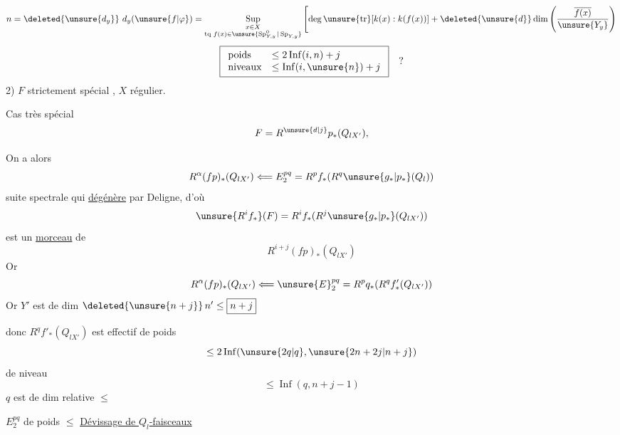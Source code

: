 \diagram{\[
\begin{tikzcd}
X\arrow[d,"f"]\\
Y\ni y
\end{tikzcd}
\]}
\[
n=\deleted{\unsure{d_y}}\ d_y(\unsure{f|\varphi})
=\underset{\substack{x\in X\\ \text{tq }f(x)\in\unsure{\operatorname{Sp}^{0}_{Y,y}|\operatorname{Sp}_{Y,y}}}}{\operatorname{Sup}}
\left[\deg\unsure{\operatorname{tr}}[k(x):k(f(x))]
+\deleted{\unsure{d}}\dim\left(\frac{\overline{f(x)}}{\unsure{Y_y}}\right)\right.
\]
\[
\boxed{\begin{array}{ll}
\text{poids}&\le2\operatorname{Inf}(i,n)+j\\
\text{niveaux}&\le\operatorname{Inf}(i,\unsure{n})+j
\end{array}}\quad ?
\]
2) \(F\)  strictement spécial
, \(X\) régulier.

Cas très spécial
\[
F=R^{\unsure{d|j}}p_*(Q_{lX'}),
\]

On a alors
\[
R^\alpha(fp)_*(Q_{lX'})
\Longleftarrow E_2^{pq}=R^pf_*(R^q\unsure{g_*|p_*}(Q_l))
\]
suite spectrale qui \uline{dégénère} par Deligne,
d'où
\[
\unsure{R^if_*}(F)=R^if_*(R^j\unsure{g_*|p_*}(Q_{lX'}))
\]
est un \uline{morceau} de
\[
R^{i+j}(fp)_*(Q_{lX'})
\]
Or
\[
R^\alpha(fp)_*(Q_{lX'})
\Longleftarrow \unsure{E}_2^{pq}=R^pq_*(R^qf'_*(Q_{lX'}))
\]
Or \(Y'\) est de dim \(\deleted{\unsure{n+j}}\,n'\le\boxed{n+j}\)

donc \(R^qf'_*(Q_{lX'})\) est effectif de poids
\[
\le2\operatorname{Inf}(\unsure{2q|q},\unsure{2n+2j|n+j})
\]
de niveau
\[
\le\operatorname{Inf}(q,n+j-1)
\]
\(q\) est de dim relative \(\le\)


 \(E_2^{pq}\) de poids \(\le\)
\uline{Dévissage de \(Q_l\)-faisceaux}

